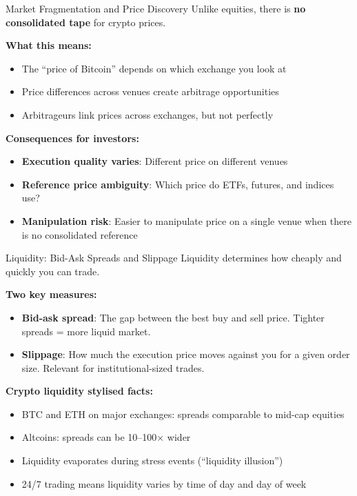 \documentclass[10pt]{beamer}
\newcommand{\highlight}[1]{\textcolor{AccentOrange}{\textbf{#1}}}
\begin{document}
\begin{frame}{Market Fragmentation and Price Discovery}
  Unlike equities, there is \highlight{no consolidated tape} for crypto prices.
  
  \vspace{0.5em}
  \textbf{What this means:}
  \begin{itemize}
    \item The ``price of Bitcoin'' depends on which exchange you look at
    \item Price differences across venues create arbitrage opportunities
    \item Arbitrageurs link prices across exchanges, but not perfectly
  \end{itemize}
  
  \vspace{0.5em}
  \textbf{Consequences for investors:}
  \begin{itemize}
    \item \textbf{Execution quality varies}: Different price on different venues
    \item \textbf{Reference price ambiguity}: Which price do ETFs, futures, and indices use?
    \item \textbf{Manipulation risk}: Easier to manipulate price on a single venue when there is no consolidated reference
  \end{itemize}
  
\end{frame}

\begin{frame}{Liquidity: Bid-Ask Spreads and Slippage}
  Liquidity determines how cheaply and quickly you can trade.
  
  \vspace{0.5em}
  \textbf{Two key measures:}
  \begin{itemize}
    \item \textbf{Bid-ask spread}: The gap between the best buy and sell price. Tighter spreads = more liquid market.
    \item \textbf{Slippage}: How much the execution price moves against you for a given order size. Relevant for institutional-sized trades.
  \end{itemize}
  
  \vspace{0.5em}
  \textbf{Crypto liquidity stylised facts:}
  \begin{itemize}
    \item BTC and ETH on major exchanges: spreads comparable to mid-cap equities
    \item Altcoins: spreads can be 10--100$\times$ wider
    \item Liquidity evaporates during stress events (``liquidity illusion'')
    \item 24/7 trading means liquidity varies by time of day and day of week
  \end{itemize}
  
\end{frame}
\end{document}

